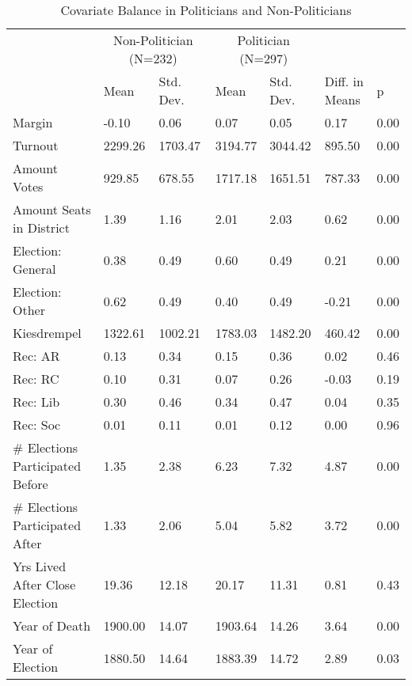 \begin{table}

\caption{\label{tab:covariate_balance_standard}Covariate Balance in Politicians and Non-Politicians}
\centering
\begin{tabular}[t]{lllllll}
\toprule
\multicolumn{1}{c}{ } & \multicolumn{2}{c}{Non-Politician (N=232)} & \multicolumn{2}{c}{Politician (N=297)} & \multicolumn{1}{c}{    } & \multicolumn{1}{c}{    } \\
\cmidrule(l{3pt}r{3pt}){2-3} \cmidrule(l{3pt}r{3pt}){4-5}
  & Mean & Std. Dev. & Mean  & Std. Dev.  & Diff. in Means & p\\
\midrule
Margin & -0.10 & 0.06 & 0.07 & 0.05 & 0.17 & 0.00\\
Turnout & 2299.26 & 1703.47 & 3194.77 & 3044.42 & 895.50 & 0.00\\
Amount Votes & 929.85 & 678.55 & 1717.18 & 1651.51 & 787.33 & 0.00\\
Amount Seats in District & 1.39 & 1.16 & 2.01 & 2.03 & 0.62 & 0.00\\
Election: General & 0.38 & 0.49 & 0.60 & 0.49 & 0.21 & 0.00\\
Election: Other & 0.62 & 0.49 & 0.40 & 0.49 & -0.21 & 0.00\\
Kiesdrempel & 1322.61 & 1002.21 & 1783.03 & 1482.20 & 460.42 & 0.00\\
Rec: AR & 0.13 & 0.34 & 0.15 & 0.36 & 0.02 & 0.46\\
Rec: RC & 0.10 & 0.31 & 0.07 & 0.26 & -0.03 & 0.19\\
Rec: Lib & 0.30 & 0.46 & 0.34 & 0.47 & 0.04 & 0.35\\
Rec: Soc & 0.01 & 0.11 & 0.01 & 0.12 & 0.00 & 0.96\\
\# Elections Participated Before & 1.35 & 2.38 & 6.23 & 7.32 & 4.87 & 0.00\\
\# Elections Participated After & 1.33 & 2.06 & 5.04 & 5.82 & 3.72 & 0.00\\
Yrs Lived After Close Election & 19.36 & 12.18 & 20.17 & 11.31 & 0.81 & 0.43\\
Year of Death & 1900.00 & 14.07 & 1903.64 & 14.26 & 3.64 & 0.00\\
Year of Election & 1880.50 & 14.64 & 1883.39 & 14.72 & 2.89 & 0.03\\
\bottomrule
\end{tabular}
\end{table}
